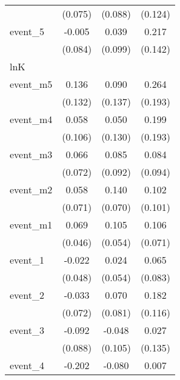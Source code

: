 {\begin{tabular}{l*{3}{c}}
            &     (0.075)         &     (0.088)         &     (0.124)         \\
[1em]
event\_5     &      -0.005         &       0.039         &       0.217         \\
            &     (0.084)         &     (0.099)         &     (0.142)         \\
\hline
lnK         &                     &                     &                     \\
event\_m5    &       0.136         &       0.090         &       0.264         \\
            &     (0.132)         &     (0.137)         &     (0.193)         \\
[1em]
event\_m4    &       0.058         &       0.050         &       0.199         \\
            &     (0.106)         &     (0.130)         &     (0.193)         \\
[1em]
event\_m3    &       0.066         &       0.085         &       0.084         \\
            &     (0.072)         &     (0.092)         &     (0.094)         \\
[1em]
event\_m2    &       0.058         &       0.140\sym{*}  &       0.102         \\
            &     (0.071)         &     (0.070)         &     (0.101)         \\
[1em]
event\_m1    &       0.069         &       0.105         &       0.106         \\
            &     (0.046)         &     (0.054)         &     (0.071)         \\
[1em]
event\_1     &      -0.022         &       0.024         &       0.065         \\
            &     (0.048)         &     (0.054)         &     (0.083)         \\
[1em]
event\_2     &      -0.033         &       0.070         &       0.182         \\
            &     (0.072)         &     (0.081)         &     (0.116)         \\
[1em]
event\_3     &      -0.092         &      -0.048         &       0.027         \\
            &     (0.088)         &     (0.105)         &     (0.135)         \\
[1em]
event\_4     &      -0.202\sym{*}  &      -0.080         &       0.007         \\

\end{tabular}}
